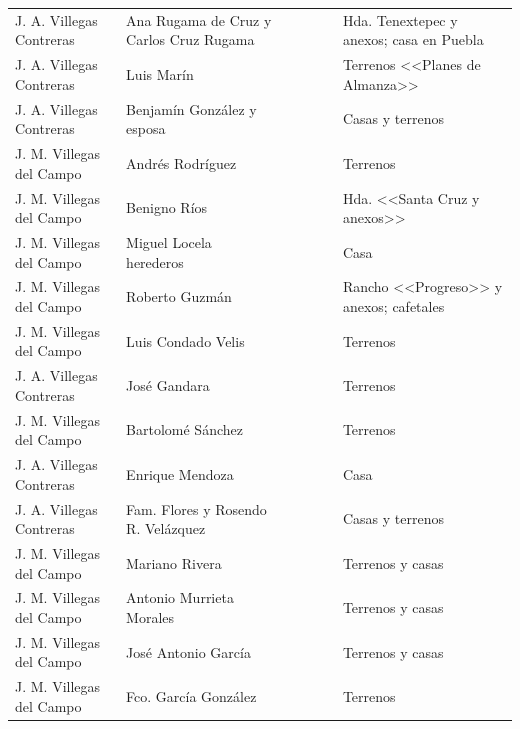 \documentclass[14pt,twoside,final]{extbook} %
\begin{document}
{\begin{longtable}[c]{@{}p{2.5cm}lrSrrl@{}}
J. A. Villegas Contreras & Ana Rugama de Cruz y Carlos Cruz Rugama &  &  &  &  & Hda. Tenextepec y anexos; casa en Puebla \\
J. A. Villegas Contreras & Luis Marín &  &  &  &  & Terrenos <<Planes de Almanza>> \\
J. A. Villegas Contreras & Benjamín González y esposa &  &  &  &  & Casas y terrenos \\
J. M. Villegas del Campo & Andrés Rodríguez &  &  &  &  & Terrenos \\
J. M. Villegas del Campo & Benigno Ríos &  &  &  &  & Hda. <<Santa Cruz y anexos>> \\
J. M. Villegas del Campo & Miguel Locela herederos &  &  &  &  & Casa \\
J. M. Villegas del Campo & Roberto Guzmán &  &  &  &  & Rancho <<Progreso>> y anexos; cafetales \\
J. M. Villegas del Campo & Luis Condado Velis &  & {} & {} & {} & Terrenos \\
J. A. Villegas Contreras & José Gandara &  &  &  &  & Terrenos \\
J. M. Villegas del Campo & Bartolomé Sánchez &  & {} &  &  & Terrenos \\
J. A. Villegas Contreras & Enrique Mendoza &  &  &  &  & Casa \\
J. A. Villegas Contreras & Fam. Flores y Rosendo R. Velázquez &  &  &  &  & Casas y terrenos \\
J. M. Villegas del Campo & Mariano Rivera &  &  &  &  & Terrenos y casas \\
J. M. Villegas del Campo & Antonio Murrieta Morales &  &  &  &  & Terrenos y casas \\
J. M. Villegas del Campo & José Antonio García &  &  &  &  & Terrenos y casas \\
J. M. Villegas del Campo & Fco. García González &  &  &  &  & Terrenos \\

\end{longtable}}
\end{document}

